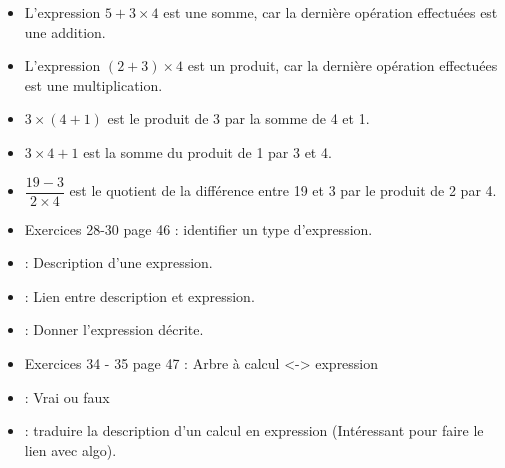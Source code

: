 \documentclass[12pt,a4paper]{article}
\begin{document}
	
\begin{myexs}
	\begin{itemize}
		\item L'expression $5 + 3 \times 4$ est une somme, car la dernière opération effectuées est une addition.
		
		\item L'expression $(2 + 3 ) \times 4$ est un produit, car la dernière opération effectuées est une multiplication.
		
		\item $ 3 \times (4 + 1)$ est le produit de 3 par la somme de 4 et 1.
		
		\item $ 3 \times 4 + 1$ est la somme du produit de 1 par 3 et  4.
		
		\item $\dfrac{19 - 3}{2 \times 4}$ est le quotient de la différence entre  19 et 3 par le produit de 2 par 4.
	\end{itemize}
\end{myexs}

\begin{myexos}
	\begin{itemize}
		\item Exercices 28-30 page 46 : identifier un type d'expression.
		\item {} : Description d'une expression.
		\item {} : Lien entre description et expression.
		\item {} : Donner l'expression décrite.
		\item Exercices 34 - 35 page 47 : Arbre à calcul <-> expression
		\item {} : Vrai ou faux
		\item {} : traduire la description d'un calcul en expression (Intéressant pour faire le lien avec algo).
	\end{itemize}
\end{myexos}
\end{document}
